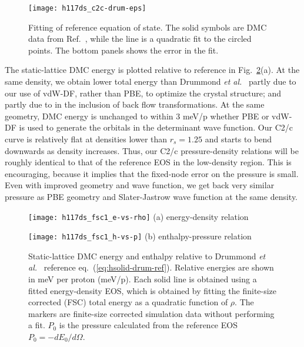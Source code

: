 \begin{figure}[h]
	\centering
	\texttt{[image: h117ds\_c2c-drum-eps]}
	\caption{Fitting of reference equation of state. The solid symbols are DMC data from Ref.~\cite{Drummond2015}, while the line is a quadratic fit to the circled points. The bottom panels shows the error in the fit.}
	\label{fig:hsolid-drum-eos}
\end{figure}

The static-lattice DMC energy is plotted relative to reference in Fig.~\ref{fig:static-qmc-vs-drummond}(a). At the same density, we obtain lower total energy than Drummond \textit{et al.}~\cite{Drummond2015} partly due to our use of vdW-DF, rather than  PBE, to optimize the crystal structure; and partly due to in the inclusion of back flow transformations. At the same geometry, DMC energy is unchanged to within 3 meV/p whether PBE or vdW-DF is used to generate the orbitals in the determinant wave function.
Our C2/c curve is relatively flat at densities lower than $r_s=1.25$ and starts to bend downwards as density increases.
Thus, our C2/c pressure-density relations will be roughly identical to that of the reference EOS in the low-density region.
This is encouraging, because it implies that the fixed-node error on the pressure is small.
Even with improved geometry and wave function, we get back very similar pressure as PBE geometry and Slater-Jastrow wave function at the same density.

\begin{figure}[h]
	\begin{minipage}{0.49\textwidth}
		\centering
		\texttt{[image: h117ds\_fsc1\_e-vs-rho]}
		(a) energy-density relation
	\end{minipage}
	\begin{minipage}{0.49\textwidth}
		\centering
		\texttt{[image: h117ds\_fsc1\_h-vs-p]}
		(b) enthalpy-pressure relation
	\end{minipage}
	\caption{Static-lattice DMC energy and enthalpy relative to Drummond \textit{et al.}~\cite{Drummond2015} reference eq.~(\ref{eq:hsolid-drum-ref}). Relative energies are shown in meV per proton (meV/p). Each solid line is obtained using a fitted energy-density EOS, which is obtained by fitting the finite-size corrected (FSC) total energy as a quadratic function of $\rho$. The markers are finite-size corrected simulation data without performing a fit. $P_0$ is the pressure calculated from the reference EOS $P_0=-dE_0/d\Omega$. \label{fig:static-qmc-vs-drummond}}
\end{figure}

